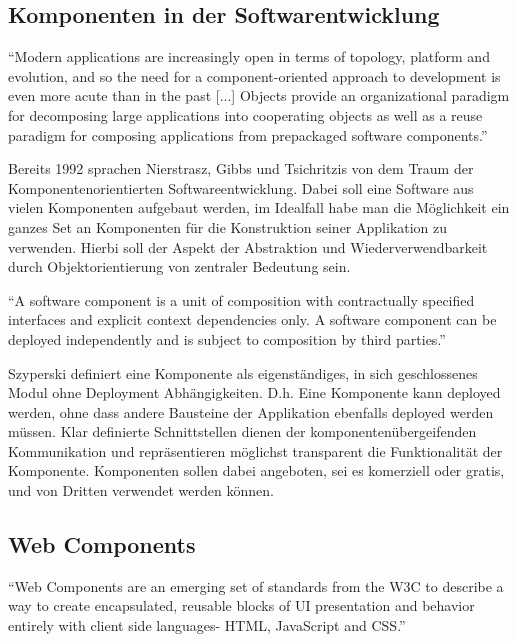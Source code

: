 \subsection{Komponenten in der Softwarentwicklung}

``Modern applications are increasingly
open in terms of topology,
platform and evolution, and so the
need for a component-oriented
approach to development is even
more acute than in the past [...]  Objects provide an organizational
paradigm for decomposing large
applications into cooperating objects
as well as a reuse paradigm for
composing applications from prepackaged
software components.''
\cite{nierstrasz1992component}

\vspace{0.5cm}

Bereits 1992 sprachen Nierstrasz, Gibbs und Tsichritzis von dem Traum der Komponentenorientierten Softwareentwicklung.
Dabei soll eine Software aus vielen Komponenten aufgebaut werden, im Idealfall habe man die Möglichkeit ein
ganzes Set an Komponenten für die Konstruktion seiner Applikation zu verwenden.
Hierbi soll der Aspekt der Abstraktion und Wiederverwendbarkeit durch Objektorientierung von zentraler Bedeutung sein.

\vspace{0.5cm}
``A software component is a unit of composition with contractually specified interfaces and explicit
context dependencies only. A software component can be deployed independently and is subject to composition
by third parties.''
\cite{Szyperski}
\vspace{0.5cm}

Szyperski definiert eine Komponente als eigenständiges, in sich geschlossenes Modul ohne Deployment
Abhängigkeiten. D.h. Eine Komponente kann deployed werden, ohne dass andere Bausteine der Applikation ebenfalls deployed werden müssen.
Klar definierte Schnittstellen dienen der komponentenübergeifenden Kommunikation und repräsentieren
möglichst transparent die Funktionalität der Komponente.
Komponenten sollen dabei angeboten, sei es komerziell oder gratis,
und von Dritten verwendet werden können.


\subsection{Web Components}

``Web Components are an emerging set of standards from the W3C to describe a way to create encapsulated,
reusable blocks of UI presentation and behavior entirely with client side languages- HTML, JavaScript and CSS.''
\cite[42]{Web-Component-Architecture}
\vspace{1cm}


